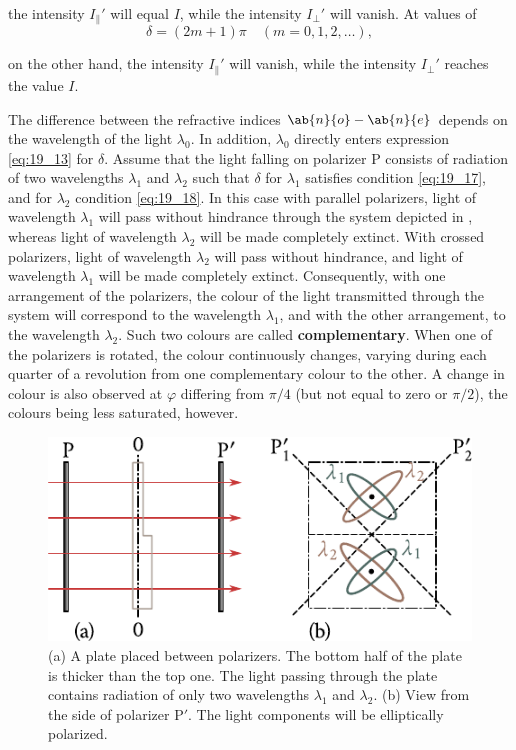 \noindent
the intensity $I_{\parallel}'$ will equal $I$, while the intensity $I_{\perp}'$ will vanish.
At values of
\begin{equation}\label{eq:19_18}
	\delta = (2m+1) \pi \quad (m=0,1,2,\ldots),
\end{equation}

\noindent
on the other hand, the intensity $I_{\parallel}'$ will vanish, while the intensity $I_{\perp}'$ reaches the value $I$.

The difference between the refractive indices $\ab{n}{o} - \ab{n}{e}$ depends on the wavelength of the light $\lambda_0$.
In addition, $\lambda_0$ directly enters expression
\eqref{eq:19_13} for $\delta$.
Assume that the light falling on polarizer P consists of radiation of two wavelengths $\lambda_1$ and $\lambda_2$ such that $\delta$ for $\lambda_1$ satisfies condition \eqref{eq:19_17}, and for $\lambda_2$ condition \eqref{eq:19_18}.
In this case with parallel polarizers, light of wavelength $\lambda_1$ will pass without hindrance through the system depicted in , whereas light of wavelength $\lambda_2$ will be made completely extinct.
With crossed polarizers, light of wavelength $\lambda_2$ will pass without hindrance, and light of wavelength $\lambda_1$ will be made completely extinct.
Consequently, with one arrangement of the polarizers, the colour of the light transmitted through the system will correspond to the wavelength $\lambda_1$, and with the other arrangement, to the wavelength $\lambda_2$.
Such two colours are called \textbf{complementary}.
When one of the polarizers is rotated, the colour continuously changes, varying during each quarter of a revolution from one complementary colour to the other.
A change in colour is also observed at $\varphi$ differing from $\pi/4$ (but not equal to zero or $\pi/2$), the colours being less saturated, however.

\begin{figure}[t]
	\begin{center}
		\includegraphics[scale=0.95]{figures/ch_19/fig_19_18.pdf}
        \caption[]{(a) A plate placed between polarizers. The bottom half of the plate is thicker than the top one. The light passing through the plate contains radiation of only two wavelengths $\lambda_1$ and $\lambda_2$. (b) View from the side of polarizer P$'$. The light components will be elliptically polarized.}
		\label{fig:19_18}
	\end{center}
	\vspace{-0.8cm}
\end{figure}

